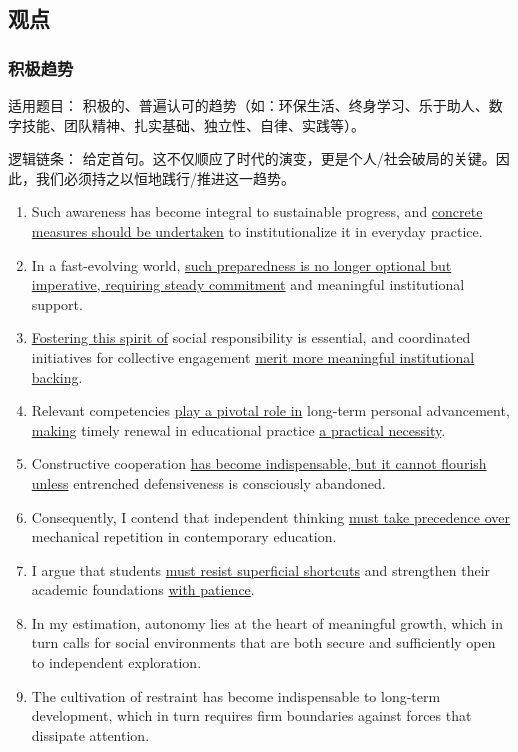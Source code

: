 \subsection{观点}

\subsubsection{积极趋势}

适用题目： 积极的、普遍认可的趋势（如：环保生活、终身学习、乐于助人、数字技能、团队精神、扎实基础、独立性、自律、实践等）。

逻辑链条： 给定首句。这不仅顺应了时代的演变，更是个人/社会破局的关键。因此，我们必须持之以恒地践行/推进这一趋势。

\begin{enumerate}
    \item Such awareness has become integral to sustainable progress, and \underline{concrete measures should be undertaken} to institutionalize it in everyday practice.
    \item In a fast-evolving world, \underline{such preparedness is no longer optional but imperative, requiring steady commitment} and meaningful institutional support.
    \item \underline{Fostering this spirit of} social responsibility is essential, and coordinated initiatives for collective engagement \underline{merit more meaningful institutional backing}.
    \item Relevant competencies \underline{play a pivotal role in} long-term personal advancement, \underline{making} timely renewal in educational practice \underline{a practical necessity}.
    \item Constructive cooperation \underline{has become indispensable, but it cannot flourish unless} entrenched defensiveness is consciously abandoned.
    \item Consequently, I contend that independent thinking \underline{must take precedence over} mechanical repetition in contemporary education.
    \item I argue that students \underline{must resist superficial shortcuts} and strengthen their academic foundations \underline{with patience}.
    \item In my estimation, autonomy lies at the heart of meaningful growth, which in turn calls for social environments that are both secure and sufficiently open to independent exploration.
    \item The cultivation of restraint has become indispensable to long-term development, which in turn requires firm boundaries against forces that dissipate attention.

\end{enumerate}
